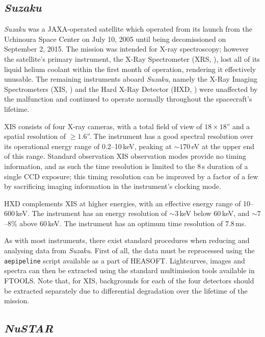 \subsection{\textit{Suzaku}}

\par \textit{Suzaku} \citep{Mitsuda_Suzaku} was a JAXA-operated satellite which operated from its launch from the Uchinoura Space Center on July 10, 2005 until being decomissioned on September 2, 2015.  The mission was intended for X-ray spectroscopy; however the satellite's primary instrument, the X-Ray Spectrometer (XRS, \citealp{Kelley_XRS}), lost all of its liquid helium coolant within the first month of operation, rendering it effectively unusable.  The remaining instruments aboard \textit{Suzaku}, namely the X-Ray Imaging Spectrometers (XIS, \citealp{Koyama_XIS}) and the Hard X-Ray Detector (HXD, \citealp{Takahashi_HXD}) were unaffected by the malfunction and continued to operate normally throughout the spacecraft's lifetime.
\par XIS consists of four X-ray cameras, with a total field of view of $18\times18$'' and a spatial resolution of $\geq1.6$''.  The instrument has a good spectral resolution over its operational energy range of 0.2--10\,keV, peaking at $\sim170$\,eV at the upper end of this range.  Standard observation XIS observation modes provide no timing information, and as such the time resolution is limited to the 8\,s duration of a single CCD exposure; this timing resolution can be improved by a factor of a few by sacrificing imaging information in the instrument's clocking mode.
\par HXD complements XIS at higher energies, with an effective energy range of 10--600\,keV.  The instrument has an energy resolution of $\sim3$\,keV below 60\,keV, and $\sim7$--8\% above 60\,keV.  The instrument has an optimum time resolution of 7.8\,ms.
\par As with most instruments, there exist standard procedures when reducing and analysing data from \textit{Suzaku}.  First of all, the data must be reprocessed using the \texttt{aepipeline} script available as a part of HEASOFT.  Lightcurves, images and spectra can then be extracted using the standard multimission tools available in FTOOLS.  Note that, for XIS, backgrounds for each of the four detectors should be extracted separately due to differential degradation over the lifetime of the mission.

\subsection{\textit{NuSTAR}}

